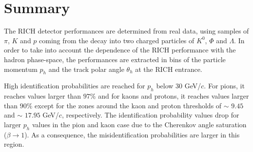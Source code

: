 
\newpage

\section{Summary}

The RICH detector performances are determined from real data, using samples of $\pi$, $K$ and $p$ coming from the decay into two charged particles of $K^0$, $\Phi$ and $\Lambda$. In order to take into account the dependence of the RICH performance with the hadron phase-space, the performances are extracted in bins of the particle momentum $p_h$ and the track polar angle $\theta_h$ at the RICH entrance.

High identification probabilities are reached for $p_h$ below $30$ GeV/$c$. For pions, it reaches values larger than $97\%$ and for kaons and protons, it reaches values larger than $90\%$ except for the zones around the kaon and proton thresholds of $\sim$ $9.45$ and $\sim$ $17.95$ GeV/$c$, respectively. The identification probability values drop for larger $p_h$ values in the pion and kaon case due to the Cherenkov angle saturation ($\beta \rightarrow 1$). As a consequence, the misidentification probabilities are larger in this region.
